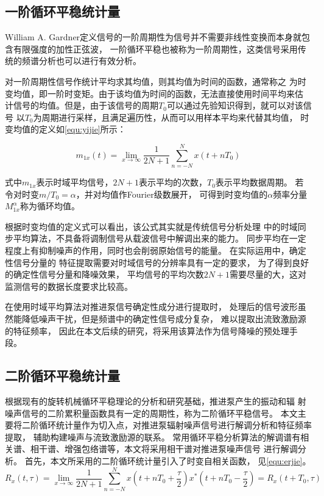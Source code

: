 \subsection{一阶循环平稳统计量}
William A. Gardner定义信号的一阶周期性为信号并不需要非线性变换而本身就包含有限强度的加性正弦波，
一阶循环平稳也被称为一阶周期性，这类信号采用传统的频谱分析也可以进行有效分析。

对一阶周期性信号作统计平均求其均值，则其均值为时间的函数，通常称之
为时变均值，即一阶时变矩。由于该均值为时间的函数，无法直接使用时间平均来估
计信号的均值。但是，由于该信号的周期$T_{0}$可以通过先验知识得到，就可以对该信号
以$T_{0}$为周期进行采样，且满足遍历性，从而可以用样本平均来代替其均值，
时变均值的定义如\autoref{equ:yijie}所示：

\begin{equation}
    \label{equ:yijie}
    m_{1x} \left ( t \right ) =\lim_{x \to \infty} \frac{1}{2N+1}\sum_{n=-N}^{N}x\left ( t+nT_{0}  \right )   
\end{equation}

式中$m_{1x}$表示时域平均信号，$2N+1$表示平均的次数，$T_{0}$表示平均数据周期。
若令对时变$m/T_{0} =\alpha$，并对均值作Fourier级数展开，
可得到时变均值的$\alpha$频率分量$M_{1x}^{\alpha}$称为循环均值。

根据时变均值的定义式可以看出，该公式其实就是传统信号分析处理
中的时域同步平均算法，不具备将调制信号从载波信号中解调出来的能力。
同步平均在一定程度上有抑制噪声的作用，同时也会削弱原始信号的能量。
在实际运用中，确定性信号分量的
特征提取需要对时域信号的分辨率具有一定的要求，
为了得到良好的确定性信号分量和降噪效果，
平均信号的平均次数$2N+1$需要尽量的大，这对监测信号的数据长度要求比较高。

在使用时域平均算法对推进泵信号确定性成分进行提取时，
处理后的信号波形虽然能降低噪声干扰，但是频谱中的确定性信号成分复杂，
难以提取出流致激励源的特征频率，
因此在本文后续的研究，将采用该算法作为信号降噪的预处理手段。

\subsection{二阶循环平稳统计量}
根据现有的旋转机械循环平稳理论的分析和研究基础，推进泵产生的振动和辐
射噪声信号的二阶累积量函数具有一定的周期性，称为二阶循环平稳信号。
本文主要将二阶循环统计量作为切入点，对推进泵辐射噪声信号进行解调分析和特征频率提取，
辅助构建噪声与流致激励源的联系。
常用循环平稳分析算法的解调谱有相关谱、相干谱、增强包络谱等，本文将采用相干谱对推进泵噪声信号
进行解调分析。
首先，本文所采用的二阶循环统计量引入了时变自相关函数，
见\autoref{equ:erjie}。 
\begin{equation}
    \label{equ:erjie}
    R_{x} \left ( t,\tau  \right ) =\lim_{x \to \infty} \frac{1}{2N+1} \sum_{n=-N}^{N} x\left ( t+nT_0+\frac{\tau }{2}  \right )x^{\ast }\left ( t+nT_0-\frac{\tau }{2}  \right )=R_{x}\left ( t+T_0,\tau  \right )    
\end{equation}

